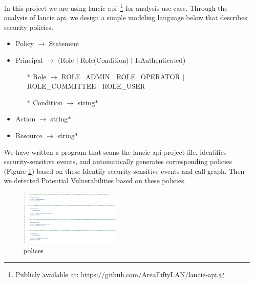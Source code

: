 In this project we are using lancie api~\footnote{Publicly available at:
  https://github.com/AreaFiftyLAN/lancie-api.} for analysis use case.
%
Through the analysis of lancie api, we design a simple modeling language below
that describes security policies.
\begin{itemize}
  \item Policy $\rightarrow$ Statement
  \item Principal $\rightarrow$ (Role $|$ Role(Condition) $|$ IsAuthenticated)
        \begin{itemize}
          \item[*] Role $\rightarrow$ ROLE\_ADMIN $|$ ROLE\_OPERATOR $|$ ROLE\_COMMITTEE $|$ ROLE\_USER
          \item[*] Condition $\rightarrow$ string$*$
        \end{itemize}
  \item Action $\rightarrow$ string$*$
  \item Resource $\rightarrow$ string$*$
\end{itemize}

We have written a program that scans the lancie api project file, identifies
security-sensitive events, and automatically generates corresponding
policies (Figure \ref{fig:policies}) based on these Identify security-sensitive
events and call graph. Then we detected Potential Vulnerabilities based on these
policies.
\begin{figure}[htp]
  \centering
  \includegraphics[width=0.45\textwidth]{img/policies.png}
  \caption{polices}
  \label{fig:policies}
\end{figure}

